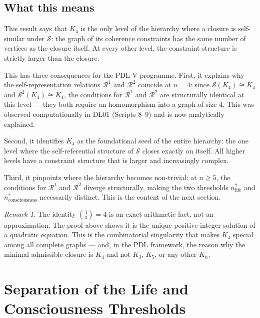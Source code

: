 \documentclass[12pt,a4paper]{article}
\theoremstyle{plain}
\theoremstyle{definition}
\theoremstyle{remark}
\newtheorem{remark}[theorem]{Remark}
\newcommand{\Kfour}{K_4}
\newcommand{\Sop}{\mathcal{S}}
\newcommand{\Rop}{\mathcal{R}}
\newcommand{\nlife}{n^{*}_{\mathrm{life}}}
\newcommand{\ncons}{n^{*}_{\mathrm{consciousness}}}
\begin{document}
\subsection{What this means}

This result says that $\Kfour$ is the only level of the hierarchy where a closure is
self-similar under $\Sop$: the graph of its coherence constraints has the same number
of vertices as the closure itself. At every other level, the constraint structure is
strictly larger than the closure.

This has three consequences for the PDL-V programme. First, it explains why the
self-representation relations $\Rop^1$ and $\Rop^2$ coincide at $n = 4$: since
$\Sop(\Kfour) \cong \Kfour$ and $\Sop^2(\Kfour) \cong \Kfour$, the conditions for
$\Rop^1$ and $\Rop^2$ are structurally identical at this level --- they both require
an homomorphism into a graph of size 4. This was observed computationally in DL01
(Scripts 8--9) and is now analytically explained.

Second, it identifies $\Kfour$ as the foundational seed of the entire hierarchy: the
one level where the self-referential structure of $\Sop$ closes exactly on itself. All
higher levels have a constraint structure that is larger and increasingly complex.

Third, it pinpoints where the hierarchy becomes non-trivial: at $n \geq 5$, the
conditions for $\Rop^1$ and $\Rop^2$ diverge structurally, making the two thresholds
$\nlife$ and $\ncons$ necessarily distinct. This is the content of the next section.

\begin{remark}
The identity $\binom{4}{3} = 4$ is an exact arithmetic fact, not an approximation.
The proof above shows it is the unique positive integer solution of a quadratic
equation. This is the combinatorial singularity that makes $\Kfour$ special among all
complete graphs --- and, in the PDL framework, the reason why the minimal admissible
closure is $\Kfour$ and not $K_3$, $K_5$, or any other $K_n$.
\end{remark}

\section{Separation of the Life and Consciousness Thresholds}
\label{sec:separation}
\end{document}
